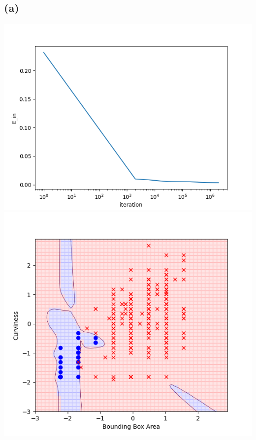 \documentclass{article}
\begin{document}
	\subsection*{(a)}
		\includegraphics[scale=0.8]{2a1}\\
		\includegraphics[scale=0.8]{2a2}
		
\end{document}
